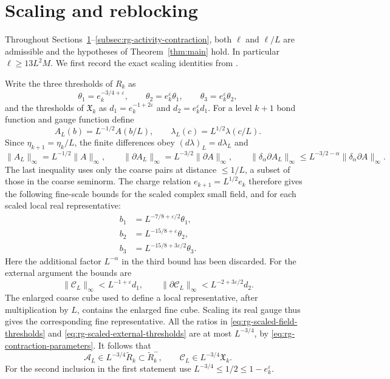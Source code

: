 \section{Scaling and reblocking}\label{subsec:rg-scaling}

Throughout Sections~\ref{subsec:rg-scaling}--\ref{subsec:rg-activity-contraction},
both $\ell$ and $\ell/L$ are admissible and the hypotheses of
Theorem~\ref{thm:main} hold. In particular $\ell\ge13L^2M$.
We first record the exact scaling identities from
\cite[\S12.6]{QED3Manuscript}.

Write the three thresholds of $R_k$ as
\[
 \theta_1=e_k^{-3/4+\varepsilon},\qquad
 \theta_2=e_k^\varepsilon\theta_1,\qquad
 \theta_3=e_k^\varepsilon\theta_2,
\]
and the thresholds of $\mathfrak X_k$ as
$d_1=e_k^{-1+2\varepsilon}$ and $d_2=e_k^\varepsilon d_1$.
For a level $k+1$ bond function and gauge function define
\begin{equation}\label{eq:rg-connection-scaling}
 A_L(b)=L^{-1/2}A(b/L),\qquad
 \lambda_L(c)=L^{1/2}\lambda(c/L).
\end{equation}
Since $\eta_{k+1}=\eta_k/L$, the finite differences obey
$(d\lambda)_L=d\lambda_L$ and
\[
 \|A_L\|_\infty=L^{-1/2}\|A\|_\infty,\qquad
 \|\partial A_L\|_\infty=L^{-3/2}\|\partial A\|_\infty,\qquad
 \|\delta_\alpha\partial A_L\|_\infty
                \le L^{-3/2-\alpha}\|\delta_\alpha\partial A\|_\infty.
\]
The last inequality uses only the coarse pairs at distance
$\le1/L$, a subset of those in the coarse seminorm.
The charge relation $e_{k+1}=L^{1/2}e_k$ therefore gives
the following fine-scale bounds for the scaled complex
small field, and for each scaled local real representative:
\begin{equation}\label{eq:rg-scaled-field-thresholds}
 \begin{split}
 b_1&=L^{-7/8+\varepsilon/2}\theta_1,\\
 b_2&=L^{-15/8+\varepsilon}\theta_2,\\
 b_3&=L^{-15/8+3\varepsilon/2}\theta_3.
 \end{split}
\end{equation}
Here the additional factor $L^{-\alpha}$ in the third bound
has been discarded. For the external argument the bounds are
\begin{equation}\label{eq:rg-scaled-external-thresholds}
 \|\mathscr C_L\|_\infty<L^{-1+\varepsilon}d_1,\qquad
 \|\partial\mathscr C_L\|_\infty<L^{-2+3\varepsilon/2}d_2.
\end{equation}
The enlarged coarse cube used to define a local representative,
after multiplication by $L$, contains the enlarged fine cube.
Scaling its real gauge thus gives the corresponding fine
representative. All the ratios in
\eqref{eq:rg-scaled-field-thresholds} and
\eqref{eq:rg-scaled-external-thresholds} are at most $L^{-3/4}$,
by \eqref{eq:rg-contraction-parameters}. It follows that
\begin{equation}\label{eq:rg-scaled-domain-inclusion}
 \mathscr A_L\in L^{-3/4}\widetilde R_k
                     \subset\widetilde R_k^-,\qquad
 \mathscr C_L\in L^{-3/4}\mathfrak X_k.
\end{equation}
For the second inclusion in the first statement use
$L^{-3/4}\le1/2\le1-e_k^\varepsilon$.

